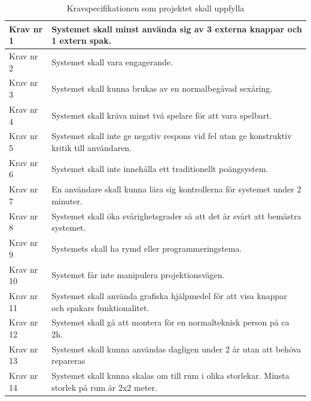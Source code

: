 \documentclass[a4paper,12pt,oneside,final]{extbook}
\begin{document}
\begin{table}[H]
	\centering
	\caption{Kravspecifikationen som projektet skall uppfylla}
	\label{Krav}
	\begin{tabular}{ | m{5em} | m{30em}| } 
		\hline
		Krav nr 1& Systemet skall minst använda sig av 3 externa knappar och 1 extern spak.   \\ 
		\hline
		Krav nr 2 & Systemet skall vara engagerande.  \\ 
		\hline
		Krav nr 3 & Systemet skall kunna brukas av en normalbegåvad sexåring. \\ 
		\hline
		Krav nr 4& Systemet skall kräva minst två spelare för att vara spelbart. \\ 
		\hline
		Krav nr 5 & Systemet skall inte ge negativ respons vid fel utan ge konstruktiv kritik till användaren. \\ 
		\hline
		Krav nr 6 & Systemet skall inte innehålla ett traditionellt poängsystem. \\ 
		\hline
		Krav nr 7& En användare skall kunna lära sig kontrollerna för systemet under 2 minuter. \\ 
		\hline
		Krav nr 8 & Systemet skall öka svårighetsgrader så att det är svårt att bemästra systemet. \\ 
		\hline
		Krav nr 9 & Systemets skall ha rymd eller programmeringstema. \\ 
		\hline
		Krav nr 10& Systemet får inte manipulera projektionsvägen. \\ 
		\hline
		Krav nr 11& Systemet skall använda grafiska hjälpmedel för att visa knappar och spakars funktionalitet.  \\ 
		\hline
		Krav nr 12& Systemet skall gå att montera för en normalteknisk person på ca 2h. \\ 
		\hline
		Krav nr 13& Systemet skall kunna användas dagligen under 2 år utan att behöva repareras \\ 
		\hline
		Krav nr 14 & Systemet skall kunna skalas om till rum i olika storlekar. Minsta storlek på rum är 2x2 meter. \\ 
		\hline
	\end{tabular}

\end{table}
\end{document}
